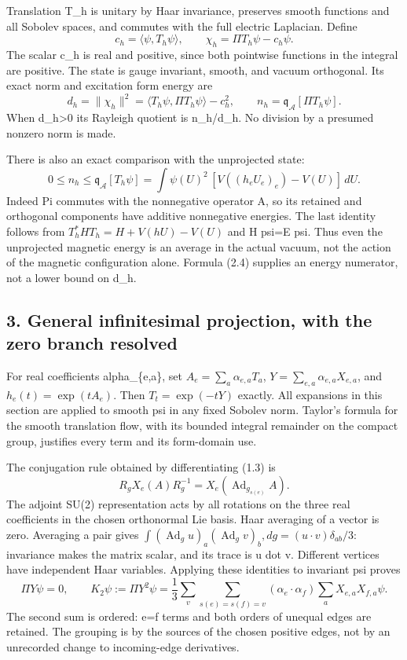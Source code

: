 \documentclass[
  11pt,
]{article}
\begin{document}
Translation T\_h is unitary by Haar invariance, preserves smooth
functions and all Sobolev spaces, and commutes with the full electric
Laplacian. Define \[
 c_h=\langle\psi,T_h\psi\rangle,
 \qquad \chi_h=\Pi T_h\psi-c_h\psi.
\tag{2.2}
\] The scalar c\_h is real and positive, since both pointwise functions
in the integral are positive. The state is gauge invariant, smooth, and
vacuum orthogonal. Its exact norm and excitation form energy are \[
 d_h=\|\chi_h\|^2
 =\langle T_h\psi,\Pi T_h\psi\rangle-c_h^2,
\qquad
 n_h=\mathfrak q_{\mathcal A}[\Pi T_h\psi].
\tag{2.3}
\] When d\_h\textgreater0 its Rayleigh quotient is n\_h/d\_h. No
division by a presumed nonzero norm is made.

There is also an exact comparison with the unprojected state: \[
 0\le n_h\le\mathfrak q_{\mathcal A}[T_h\psi]
 =\int\psi(U)^2\,[V((h_eU_e)_e)-V(U)]\,dU.
\tag{2.4}
\] Indeed Pi commutes with the nonnegative operator A, so its retained
and orthogonal components have additive nonnegative energies. The last
identity follows from \(T_h^*HT_h=H+V(hU)-V(U)\) and H psi=E psi. Thus
even the unprojected magnetic energy is an average in the actual vacuum,
not the action of the magnetic configuration alone. Formula (2.4)
supplies an energy numerator, not a lower bound on d\_h.

\subsection{3. General infinitesimal projection, with the zero branch
resolved}\label{magnetic-part-1-general-infinitesimal-projection-with-the-zero-branch-resolved}

For real coefficients alpha\_\{e,a\}, set \(A_e=\sum_a\alpha_{e,a}T_a\),
\(Y=\sum_{e,a}\alpha_{e,a}X_{e,a}\), and \(h_e(t)=\exp(tA_e)\). Then
\(T_t=\exp(-tY)\) exactly. All expansions in this section are applied to
smooth psi in any fixed Sobolev norm. Taylor's formula for the smooth
translation flow, with its bounded integral remainder on the compact
group, justifies every term and its form-domain use.

The conjugation rule obtained by differentiating (1.3) is \[
 R_gX_e(A)R_g^{-1}=X_e(\operatorname{Ad}_{g_{s(e)}}A).
\tag{3.1}
\] The adjoint SU(2) representation acts by all rotations on the three
real coefficients in the chosen orthonormal Lie basis. Haar averaging of
a vector is zero. Averaging a pair gives
\(\int(\operatorname{Ad}_g u)_a(\operatorname{Ad}_g v)_b,dg
=(u\cdot v)\delta_{ab}/3\): invariance makes the matrix scalar, and its
trace is u dot v. Different vertices have independent Haar variables.
Applying these identities to invariant psi proves \[
 \Pi Y\psi=0,\qquad
 K_2\psi:=\Pi Y^2\psi
 =\frac13\sum_v\sum_{s(e)=s(f)=v}
 (\alpha_e\cdot\alpha_f)\sum_a X_{e,a}X_{f,a}\psi.
\tag{3.2}
\] The second sum is ordered: e=f terms and both orders of unequal edges
are retained. The grouping is by the sources of the chosen positive
edges, not by an unrecorded change to incoming-edge derivatives.
\end{document}
